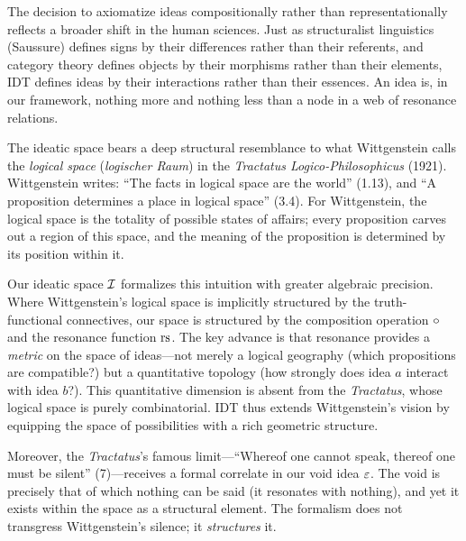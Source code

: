 \begin{interpretation}
The decision to axiomatize ideas compositionally rather than
representationally reflects a broader shift in the human sciences. Just as
structuralist linguistics (Saussure) defines signs by their differences
rather than their referents, and category theory defines objects by their
morphisms rather than their elements, IDT defines ideas by their
interactions rather than their essences. An idea is, in our framework,
nothing more and nothing less than a node in a web of resonance relations.
\end{interpretation}

\begin{interpretation}\label{interp:ch1:wittgenstein_logical_space}
The ideatic space bears a deep structural resemblance to what Wittgenstein
calls the \emph{logical space} (\emph{logischer Raum}) in the
\emph{Tractatus Logico-Philosophicus} (1921). Wittgenstein writes: ``The
facts in logical space are the world'' (1.13), and ``A proposition
determines a place in logical space'' (3.4). For Wittgenstein, the logical
space is the totality of possible states of affairs; every proposition
carves out a region of this space, and the meaning of the proposition is
determined by its position within it.

Our ideatic space $\mathcal{I}$ formalizes this intuition with greater algebraic
precision. Where Wittgenstein's logical space is implicitly structured by
the truth-functional connectives, our space is structured by the composition
operation $\circ$ and the resonance function $\mathrm{rs}$. The key advance is
that resonance provides a \emph{metric} on the space of ideas---not merely
a logical geography (which propositions are compatible?) but a quantitative
topology (how strongly does idea $a$ interact with idea $b$?). This
quantitative dimension is absent from the \emph{Tractatus}, whose logical
space is purely combinatorial. IDT thus extends Wittgenstein's vision by
equipping the space of possibilities with a rich geometric structure.

Moreover, the \emph{Tractatus}'s famous limit---``Whereof one cannot speak,
thereof one must be silent'' (7)---receives a formal correlate in our void
idea $\varepsilon$. The void is precisely that of which nothing can be said (it
resonates with nothing), and yet it exists within the space as a structural
element. The formalism does not transgress Wittgenstein's silence; it
\emph{structures} it.
\end{interpretation}

